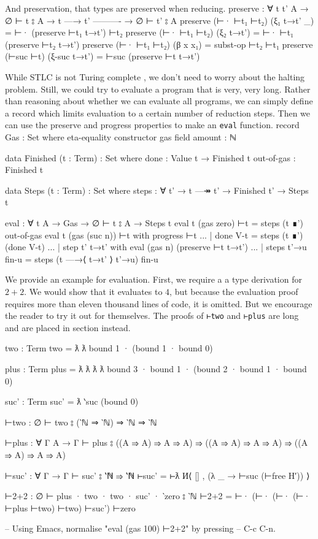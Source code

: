 \documentclass[logo,bsc,singlespacing,parskip,online]{infthesis}
\renewenvironment{code}{\mintedcopy[breaklines,breaksymbolleft=\;]{agda}}{\endmintedcopy}
\begin{document}
And preservation, that types are preserved when reducing.
\begin{code}
preserve : ∀ {t t' A}
  → ∅ ⊢ t ⦂ A
  → t —→ t'
    ----------
  → ∅ ⊢ t' ⦂ A
preserve (⊢· ⊢t₁ ⊢t₂) (ξ₁ t→t' _) = ⊢· (preserve ⊢t₁ t→t') ⊢t₂
preserve (⊢· ⊢t₁ ⊢t₂) (ξ₂ t→t') = ⊢· ⊢t₁  (preserve ⊢t₂ t→t')
preserve (⊢· ⊢t₁ ⊢t₂) (β x x₁) = subst-op ⊢t₂ ⊢t₁
preserve (⊢suc ⊢t) (ξ-suc t→t') = ⊢suc (preserve ⊢t t→t')
\end{code}

While STLC is not Turing complete \cite{church_formulation_1940}, we don't need to worry about the
halting problem. Still, we could try to evaluate a program that is very, very long. Rather than
reasoning about whether we can evaluate all programs, we can simply define a record which limits
evaluation to a certain number of reduction steps. Then we can use the preserve and progress
properties to make an \texttt{eval} function.
\begin{code}
record Gas : Set where
  eta-equality
  constructor gas
  field
    amount : ℕ

data Finished (t : Term) : Set where
  done : Value t → Finished t
  out-of-gas : Finished t

data Steps (t : Term) : Set where
  steps : ∀ {t'} → t —↠ t' → Finished t' → Steps t

eval : ∀ {t A} → Gas → ∅ ⊢ t ⦂ A → Steps t
eval {t} (gas zero) ⊢t = steps (t ∎') out-of-gas
eval {t} (gas (suc n)) ⊢t with progress ⊢t
... | done V-t = steps (t ∎') (done V-t)
... | step {t'} t→t' with eval (gas n) (preserve ⊢t t→t')
...   | steps t'→u fin-u = steps (t —→⟨ t→t' ⟩ t'→u) fin-u
\end{code}

We provide an example for evaluation. First, we require a a type derivation for $2+2$. We would show
that it evaluates to $4$, but because the evaluation proof requires more than eleven thousand lines
of code, it is omitted. But we encourage the reader to try it out for themselves. The proofs of
\texttt{⊢two} and \texttt{⊢plus} are long and are placed in section instead.

\begin{code}
two : Term
two = ƛ ƛ bound 1 · (bound 1 · bound 0)

plus : Term
plus = ƛ ƛ ƛ ƛ bound 3 · bound 1 · (bound 2 · bound 1 · bound 0)

suc' : Term
suc' = ƛ ‵suc (bound 0)

⊢two : ∅ ⊢ two ⦂ (‵ℕ ⇒ ‵ℕ) ⇒ ‵ℕ ⇒ ‵ℕ

⊢plus : ∀ {Γ A} → Γ ⊢ plus ⦂
  ((A ⇒ A) ⇒ A ⇒ A) ⇒ ((A ⇒ A) ⇒ A ⇒ A) ⇒ ((A ⇒ A) ⇒ A ⇒ A)

⊢suc' : ∀ {Γ} → Γ ⊢ suc' ⦂ ‵ℕ ⇒ ‵ℕ
⊢suc' = ⊢ƛ И⟨ [] , (λ _ → ⊢suc (⊢free H′)) ⟩

⊢2+2 : ∅ ⊢ plus · two · two · suc' · ‵zero ⦂ ‵ℕ
⊢2+2 = ⊢· (⊢· (⊢· (⊢· ⊢plus  ⊢two) ⊢two) ⊢suc') ⊢zero

-- Using Emacs, normalise "eval (gas 100) ⊢2+2" by pressing
-- C-c C-n.
\end{code}
\end{document}
